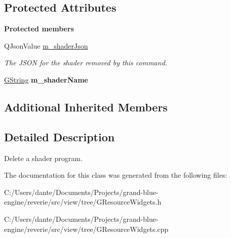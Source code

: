 \subsection*{Protected Attributes}
\begin{Indent}\textbf{ Protected members}\par
\begin{DoxyCompactItemize}
\item 
\mbox{\label{classrev_1_1_delete_shader_command_a36b355ea51bf12e7e2d5840a39b72816}} 
Q\+Json\+Value \mbox{\hyperlink{classrev_1_1_delete_shader_command_a36b355ea51bf12e7e2d5840a39b72816}{m\+\_\+shader\+Json}}
\begin{DoxyCompactList}\small\item\em The J\+S\+ON for the shader removed by this command. \end{DoxyCompactList}\item 
\mbox{\label{classrev_1_1_delete_shader_command_a13051450ba78b8c0f7664fde953a2de8}} 
\mbox{\hyperlink{classrev_1_1_g_string}{G\+String}} {\bfseries m\+\_\+shader\+Name}
\end{DoxyCompactItemize}
\end{Indent}
\subsection*{Additional Inherited Members}


\subsection{Detailed Description}
Delete a shader program. 

The documentation for this class was generated from the following files\+:\begin{DoxyCompactItemize}
\item 
C\+:/\+Users/dante/\+Documents/\+Projects/grand-\/blue-\/engine/reverie/src/view/tree/G\+Resource\+Widgets.\+h\item 
C\+:/\+Users/dante/\+Documents/\+Projects/grand-\/blue-\/engine/reverie/src/view/tree/G\+Resource\+Widgets.\+cpp\end{DoxyCompactItemize}
